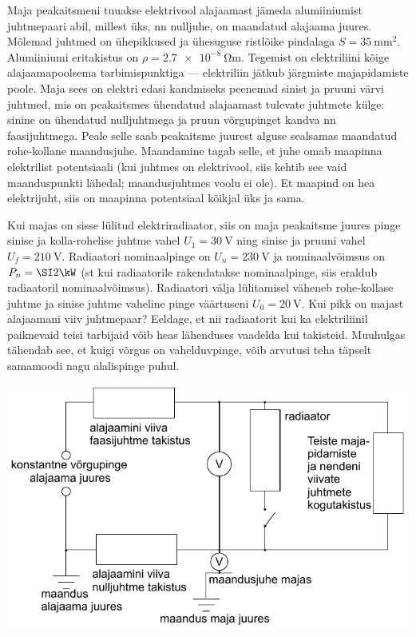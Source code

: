 
Maja peakaitsmeni tuuakse elektrivool alajaamast jämeda alumiiniumist juhtmepaari abil, millest üks, nn nulljuhe, on maandatud alajaama juures. Mõlemad juhtmed on ühepikkused ja ühesuguse ristlõike pindalaga $S=\SI{35}{\mm\squared}$. Alumiiniumi eritakistus on $\rho=\SI{2.7e-8}{\ohm\m}$. Tegemist on elektriliini kõige alajaamapoolsema tarbimispunktiga --- elektriliin jätkub järgmiste majapidamiste poole. Maja sees on elektri edasi kandmiseks peenemad sinist ja pruuni värvi juhtmed, mis on peakaitsmes ühendatud alajaamast tulevate juhtmete külge: sinine on ühendatud nulljuhtmega ja pruun võrgupinget kandva nn faasijuhtmega. Peale selle saab peakaitsme juurest alguse sealsamas maandatud rohe-kollane maandusjuhe. Maandamine tagab selle, et juhe omab maapinna elektrilist potentsiaali (kui juhtmes on elektrivool, siis kehtib see vaid maanduspunkti lähedal; maandusjuhtmes voolu ei ole). Et maapind on hea elektrijuht, siis on maapinna potentsiaal kõikjal üks ja sama. 

Kui majas on sisse lülitud  elektriradiaator, siis on maja peakaitsme juures pinge sinise ja kolla-rohelise juhtme vahel $U_1=\SI{30}\V$  ning sinise ja pruuni vahel $U_f=\SI{210}\V$. Radiaatori nominaalpinge on $U_n=\SI{230}\V$ ja nominaalvõimsus on $P_n=\SI 2{\kW}$ (st kui radiaatorile rakendatakse nominaalpinge, siis eraldub radiaatoril nominaalvõimsus). Radiaatori välja lülitamisel väheneb rohe-kollase juhtme ja sinise juhtme vaheline pinge väärtuseni $U_0=\SI{20}\V$. Kui pikk on majast alajaamani viiv juhtmepaar? Eeldage, et nii radiaatorit kui ka elektriliinil paiknevaid teisi tarbijaid võib heas lähenduses vaadelda kui takisteid. Muuhulgas tähendab see, et kuigi võrgus on vahelduvpinge, võib arvutusi teha täpselt samamoodi nagu alalispinge puhul.


\hint

\solu
\begin{center}
    \includegraphics[width=0.8\linewidth]{2023-v2g-10-sol.pdf}
\end{center}

